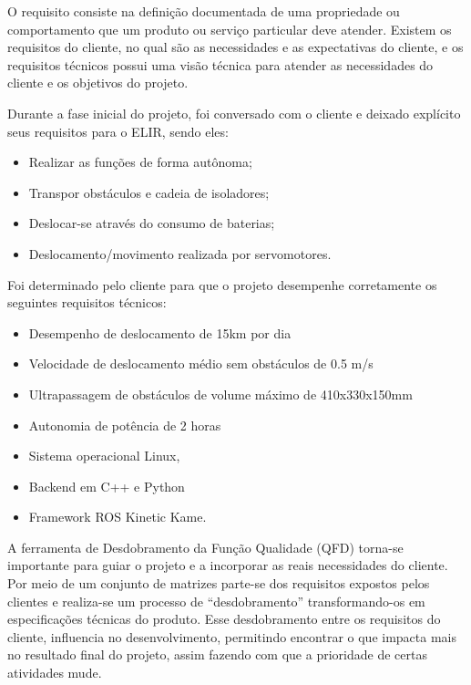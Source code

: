 O requisito consiste na definição documentada  de uma propriedade ou comportamento que um produto ou serviço particular deve atender. Existem os requisitos do cliente, no qual são as necessidades e as expectativas do cliente, e os requisitos técnicos possui uma visão técnica para atender as necessidades do cliente e os objetivos do projeto.

Durante a fase inicial do projeto, foi conversado com o cliente e deixado explícito seus requisitos para o ELIR, sendo eles:

\begin{itemize}
	\item Realizar as funções de forma autônoma;
	
	\item Transpor obstáculos e cadeia de isoladores;
	
	\item Deslocar-se através do consumo de baterias;
	
    \item Deslocamento/movimento realizada por servomotores.
    
\end{itemize}

Foi determinado pelo cliente para que o projeto desempenhe corretamente os seguintes requisitos técnicos:
\begin{itemize}
	\item Desempenho de deslocamento de 15km por dia
	
	
	\item Velocidade de deslocamento médio  sem obstáculos de 0.5 m/s
	
	
	\item Ultrapassagem de obstáculos de volume máximo de  410x330x150mm
	
	\item Autonomia de potência de 2 horas
    \item Sistema operacional Linux, 
	\item Backend em C++ e Python
	\item Framework ROS Kinetic Kame.
	
	
\end{itemize}

A ferramenta de Desdobramento da Função Qualidade (QFD) torna-se importante para guiar o projeto e a incorporar as reais necessidades do cliente.  Por meio de um conjunto de matrizes parte-se dos requisitos expostos pelos clientes e realiza-se um processo de “desdobramento” transformando-os em especificações técnicas do produto. Esse desdobramento entre os requisitos do cliente, influencia no desenvolvimento, permitindo encontrar o que impacta mais no resultado final do projeto, assim fazendo com que a prioridade de certas atividades mude.

